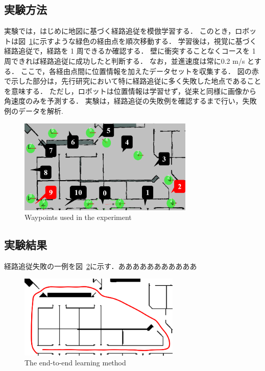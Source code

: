 \documentclass{jarticle}
\renewcommand{\figurename}{図~}
\newcommand{\figref}[1]{\figurename\ref{#1}}
\begin{document}
\subsection{実験方法}
実験では，はじめに地図に基づく経路追従を模倣学習する．
このとき，ロボットは\figref{fig:6}に示すような緑色の経由点を順次移動する．
学習後は，視覚に基づく経路追従で，経路を 1 周できるか確認する．
壁に衝突することなくコースを 1 周できれば経路追従に成功したと判断する．
なお，並進速度は常に0.2 m/s とする．
ここで，各経由点間に位置情報を加えたデータセットを収集する．
図の赤で示した部分は，先行研究において特に経路追従に多く失敗した地点であることを意味する．
ただし，ロボットは位置情報は学習せず，従来と同様に画像から角速度のみを予測する．
実験は，経路追従の失敗例を確認するまで行い，失敗例のデータを解析.

\begin{figure}[h!]
  \centering
   \includegraphics[height=45mm]{./png/location.png}
   \caption{Waypoints used in the experiment}
   \label{fig:6}
\end{figure}

\subsection{実験結果}
経路追従失敗の一例を\figref{fig:7}に示す．あああああああああああ

\begin{figure}[h!]
  \centering
   \includegraphics[height=40mm]{./png/failed.png}
   \caption{The end-to-end learning method}
   \label{fig:7}
\end{figure}

\newpage
\end{document}
